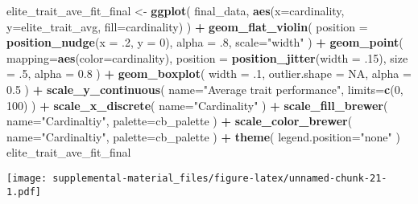 \documentclass[]{book}
\newenvironment{Shaded}{\begin{snugshade}}{\end{snugshade}}
\newcommand{\DataTypeTok}[1]{\textcolor[rgb]{0.13,0.29,0.53}{#1}}
\newcommand{\DecValTok}[1]{\textcolor[rgb]{0.00,0.00,0.81}{#1}}
\newcommand{\FloatTok}[1]{\textcolor[rgb]{0.00,0.00,0.81}{#1}}
\newcommand{\KeywordTok}[1]{\textcolor[rgb]{0.13,0.29,0.53}{\textbf{#1}}}
\newcommand{\NormalTok}[1]{#1}
\newcommand{\OperatorTok}[1]{\textcolor[rgb]{0.81,0.36,0.00}{\textbf{#1}}}
\newcommand{\OtherTok}[1]{\textcolor[rgb]{0.56,0.35,0.01}{#1}}
\newcommand{\StringTok}[1]{\textcolor[rgb]{0.31,0.60,0.02}{#1}}
\begin{document}
\begin{Shaded}
\begin{Highlighting}[]
\NormalTok{elite_trait_ave_fit_final <-}\StringTok{ }\KeywordTok{ggplot}\NormalTok{(}
\NormalTok{    final_data,}
    \KeywordTok{aes}\NormalTok{(}\DataTypeTok{x=}\NormalTok{cardinality, }\DataTypeTok{y=}\NormalTok{elite_trait_avg, }\DataTypeTok{fill=}\NormalTok{cardinality)}
\NormalTok{  ) }\OperatorTok{+}
\StringTok{  }\KeywordTok{geom_flat_violin}\NormalTok{(}
    \DataTypeTok{position =} \KeywordTok{position_nudge}\NormalTok{(}\DataTypeTok{x =} \FloatTok{.2}\NormalTok{, }\DataTypeTok{y =} \DecValTok{0}\NormalTok{),}
    \DataTypeTok{alpha =} \FloatTok{.8}\NormalTok{,}
    \DataTypeTok{scale=}\StringTok{"width"}
\NormalTok{  ) }\OperatorTok{+}
\StringTok{  }\KeywordTok{geom_point}\NormalTok{(}
    \DataTypeTok{mapping=}\KeywordTok{aes}\NormalTok{(}\DataTypeTok{color=}\NormalTok{cardinality),}
    \DataTypeTok{position =} \KeywordTok{position_jitter}\NormalTok{(}\DataTypeTok{width =} \FloatTok{.15}\NormalTok{),}
    \DataTypeTok{size =} \FloatTok{.5}\NormalTok{,}
    \DataTypeTok{alpha =} \FloatTok{0.8}
\NormalTok{  ) }\OperatorTok{+}
\StringTok{  }\KeywordTok{geom_boxplot}\NormalTok{(}
    \DataTypeTok{width =} \FloatTok{.1}\NormalTok{,}
    \DataTypeTok{outlier.shape =} \OtherTok{NA}\NormalTok{,}
    \DataTypeTok{alpha =} \FloatTok{0.5}
\NormalTok{  ) }\OperatorTok{+}
\StringTok{  }\KeywordTok{scale_y_continuous}\NormalTok{(}
    \DataTypeTok{name=}\StringTok{"Average trait performance"}\NormalTok{,}
    \DataTypeTok{limits=}\KeywordTok{c}\NormalTok{(}\DecValTok{0}\NormalTok{, }\DecValTok{100}\NormalTok{)}
\NormalTok{  ) }\OperatorTok{+}
\StringTok{  }\KeywordTok{scale_x_discrete}\NormalTok{(}
    \DataTypeTok{name=}\StringTok{"Cardinality"}
\NormalTok{  ) }\OperatorTok{+}
\StringTok{  }\KeywordTok{scale_fill_brewer}\NormalTok{(}
    \DataTypeTok{name=}\StringTok{"Cardinaltiy"}\NormalTok{,}
    \DataTypeTok{palette=}\NormalTok{cb_palette}
\NormalTok{  ) }\OperatorTok{+}
\StringTok{  }\KeywordTok{scale_color_brewer}\NormalTok{(}
    \DataTypeTok{name=}\StringTok{"Cardinaltiy"}\NormalTok{,}
    \DataTypeTok{palette=}\NormalTok{cb_palette}
\NormalTok{  ) }\OperatorTok{+}
\StringTok{  }\KeywordTok{theme}\NormalTok{(}
    \DataTypeTok{legend.position=}\StringTok{"none"}
\NormalTok{  )}
\NormalTok{elite_trait_ave_fit_final}
\end{Highlighting}
\end{Shaded}

\texttt{[image: supplemental-material\_files/figure-latex/unnamed-chunk-21-1.pdf]}
\end{document}
